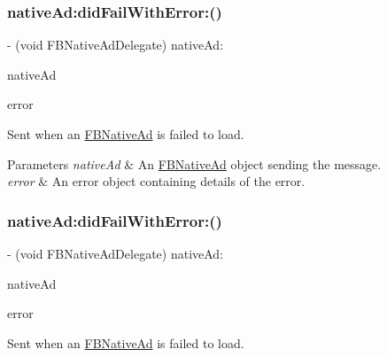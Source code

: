 \subsubsection{\texorpdfstring{native\+Ad\+:did\+Fail\+With\+Error\+:()}{nativeAd:didFailWithError:()}\hspace{0.1cm}{\footnotesize\ttfamily [3/5]}}
{\footnotesize\ttfamily -\/ (void F\+B\+Native\+Ad\+Delegate) native\+Ad\+: \begin{DoxyParamCaption}\item[{(\hyperlink{interfaceFBNativeAd}{F\+B\+Native\+Ad} $\ast$)}]{native\+Ad }\item[{didFailWithError:(N\+S\+Error $\ast$)}]{error }\end{DoxyParamCaption}}

Sent when an \hyperlink{interfaceFBNativeAd}{F\+B\+Native\+Ad} is failed to load.


\begin{DoxyParams}{Parameters}
{\em native\+Ad} & An \hyperlink{interfaceFBNativeAd}{F\+B\+Native\+Ad} object sending the message. \\
\hline
{\em error} & An error object containing details of the error. \\
\hline
\end{DoxyParams}
\mbox{\label{protocolFBNativeAdDelegate_01-p_a310f7227d74f4223c64e2543ab346304}} 
\subsubsection{\texorpdfstring{native\+Ad\+:did\+Fail\+With\+Error\+:()}{nativeAd:didFailWithError:()}\hspace{0.1cm}{\footnotesize\ttfamily [4/5]}}
{\footnotesize\ttfamily -\/ (void F\+B\+Native\+Ad\+Delegate) native\+Ad\+: \begin{DoxyParamCaption}\item[{(\hyperlink{interfaceFBNativeAd}{F\+B\+Native\+Ad} $\ast$)}]{native\+Ad }\item[{didFailWithError:(N\+S\+Error $\ast$)}]{error }\end{DoxyParamCaption}}

Sent when an \hyperlink{interfaceFBNativeAd}{F\+B\+Native\+Ad} is failed to load.


